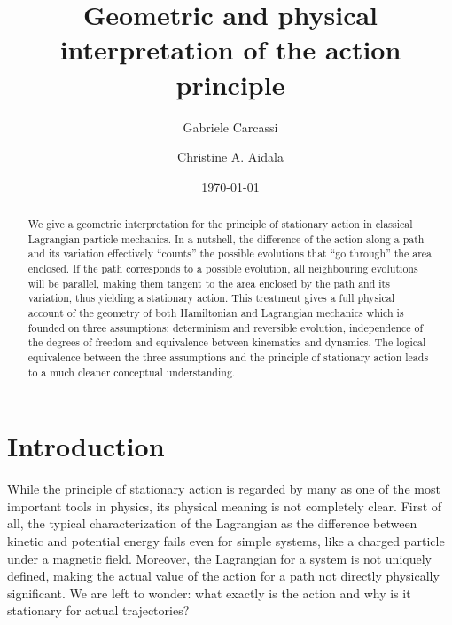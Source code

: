 \documentclass[fleqn,10pt]{wlscirep}
\begin{document}
\linenumbers

\title{Geometric and physical interpretation of the action principle}
\author[1]{Gabriele Carcassi}
\author[1,*]{Christine A. Aidala}




\date{\today}


\begin{abstract}
We give a geometric interpretation for the principle of stationary action in classical Lagrangian particle mechanics. In a nutshell, the difference of the action along a path and its variation effectively ``counts'' the possible evolutions that ``go through'' the area enclosed. If the path corresponds to a possible evolution, all neighbouring evolutions will be parallel, making them tangent to the area enclosed by the path and its variation, thus yielding a stationary action. This treatment gives a full physical account of the geometry of both Hamiltonian and Lagrangian mechanics which is founded on three assumptions: determinism and reversible evolution, independence of the degrees of freedom and equivalence between kinematics and dynamics. The logical equivalence between the three assumptions and the principle of stationary action leads to a much cleaner conceptual understanding.
\end{abstract}

\maketitle

\section*{Introduction}

While the principle of stationary action is regarded by many as one of the most important tools in physics, its physical meaning is not completely clear.\cite{hamilton1834general, heaviside1903, feynman1942principle, brenier1989least, rojo2018principle} First of all, the typical characterization of the Lagrangian as the difference between kinetic and potential energy fails even for simple systems, like a charged particle under a magnetic field. Moreover, the Lagrangian for a system is not uniquely defined, making the actual value of the action for a path not directly physically significant.  We are left to wonder: what exactly is the action and why is it stationary for actual trajectories?
\end{document}

